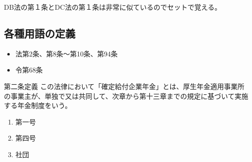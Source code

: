 \begin{explanationbox}
  DB法の第１条とDC法の第１条は非常に似ているのでセットで覚える。
\end{explanationbox}

\newpage

\subsection{各種用語の定義}

\begin{InyouJobunbox}
  \begin{itemize}
    \item 法第2条、第8条〜第10条、第94条
    \item 令第68条
  \end{itemize}
\end{InyouJobunbox}

\begin{fillblank}[数理人試験 \ 2023 \ 問題1 \ 設問1（抜粋）]

  \begin{lawstructure}
    \begin{lawarticle}{第二条}{定義}
      この法律において「確定給付企業年金」とは、厚生年金適用事業所の事業主が、単独で又は共同して、次章から第十三章までの規定に基づいて実施する年金制度をいう。
    \end{lawarticle}
  \end{lawstructure}

\end{fillblank}

\begin{answerbox}
 \begin{enumerate}[A:]
    \item 第一号
    \item 第四号
    \item 社団
  \end{enumerate}
\end{answerbox}



